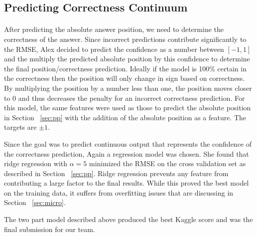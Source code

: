 \documentclass[letterpaper]{article}
\begin{document}
\subsection{Predicting Correctness Continuum}
\label{sec:pc}
\paragraph{} After predicting the absolute answer position, we need to determine the correctness of the answer.  Since incorrect predictions contribute significantly to the RMSE, Alex decided to predict the confidence as a number between $[-1,1]$ and the multiply the predicted absolute position by this confidence to determine the final position/correctness prediction.  Ideally if the model is 100\% certain in the correctness then the position will only change in sign based on correctness.  By multiplying the position by a number less than one, the position moves closer to 0 and thus decreases the penalty for an incorrect correctness prediction.  For this model, the same features were used as those to predict the absolute position in Section ~\ref{sec:pp} with the addition of the absolute position as a feature.  The targets are $\pm 1$.

Since the goal was to predict continuous output that represents the confidence of the correctness prediction, Again a regression model was chosen.  She found that ridge regression with $\alpha=5$ minimized the RMSE on the cross validation set as described in Section ~\ref{sec:pp}.  Ridge regression prevents any feature from contributing a large factor to the final results.  While this proved the best model on the training data, it suffers from overfitting issues that are discussing in Section ~\ref{sec:micro}.

The two part model described above produced the best Kaggle score and was the final submission for our team.  


\end{document}
